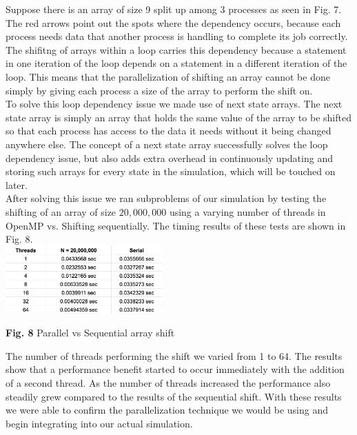 \documentclass[conference]{IEEEtran}
\begin{document}
Suppose there is an array of size 9 split up among 3 processes as seen in Fig. 7. The red arrows point out the spots where the dependency occurs, because each process needs data that another process is handling to complete its job correctly. The shifitng of arrays within a loop carries this dependency because a statement in one iteration of the loop depends on a statement in a different iteration of the loop. This means that the parallelization of shifting an array cannot be done simply by giving each process a size of the array to perform the shift on.  \\

\hspace*{.2cm} To solve this loop dependency issue we made use of next state arrays. The next state array is simply an array that holds the same value of the array to be shifted so that each process has access to the data it needs without it being changed anywhere else. The concept of a next state array successfully solves the loop dependency issue, but also adds extra overhead in continuously updating and storing such arrays for every state in the simulation, which will be touched on later. \\

\hspace*{.2cm} After solving this issue we ran subproblems of our simulation by testing the shifting of an array of size $20,000,000$ using a varying number of threads in OpenMP vs. Shifting sequentially. The timing results of these tests are shown in Fig. 8. \\

\includegraphics[width=0.45\textwidth]{subtest}
\begin{center}
	\textbf{Fig. 8} Parallel vs Sequential array shift \\
\end{center}

The number of threads performing the shift we varied from 1 to 64. The results show that a performance benefit started to occur immediately with the addition of a second thread. As the number of threads increased the performance also steadily grew compared to the results of the sequential shift. With these results we were able to confirm the parallelization technique we would be using and begin integrating into our actual simulation. \\
\end{document}
